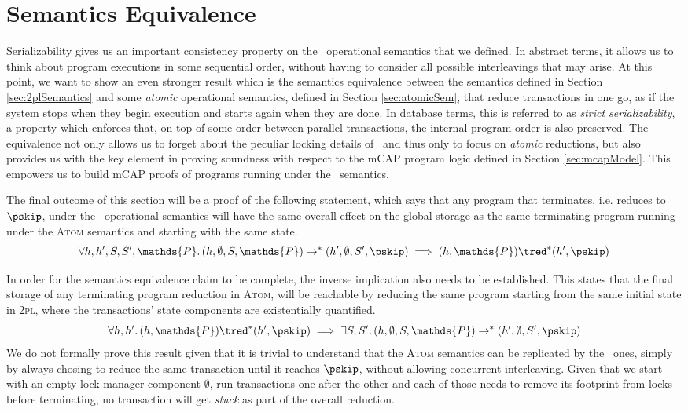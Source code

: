 \section{Semantics Equivalence}

\label{sec:semEquiv}

Serializability gives us an important consistency property on the \tpl\ operational semantics that we defined. In abstract terms, it allows us to think about program executions in some sequential order, without having to consider all possible interleavings that may arise. At this point, we want to show an even stronger result which is the semantics equivalence between the semantics defined in Section \ref{sec:2plSemantics} and some \textit{atomic} operational semantics, defined in Section \ref{sec:atomicSem}, that reduce transactions in one go, as if the system stops when they begin execution and starts again when they are done. In database terms, this is referred to as \textit{strict serializability}, a property which enforces that, on top of some order between parallel transactions, the internal program order is also preserved. The equivalence not only allows us to forget about the peculiar locking details of \tpl\ and thus only to focus on \textit{atomic} reductions, but also provides us with the key element in proving soundness with respect to the mCAP program logic defined in Section \ref{sec:mcapModel}. This empowers us to build mCAP proofs of programs running under the \tpl\ semantics.

The final outcome of this section will be a proof of the following statement, which says that any program that terminates, i.e. reduces to $\pskip$, under the \tpl\ operational semantics will have the same overall effect on the global storage as the same terminating program running under the \textsc{Atom} semantics and starting with the same state.
\[
	\forall h, h', S, S', \mathds{P} \ldotp
	(h, \emptyset, S, \mathds{P}) \rightarrow^* (h', \emptyset, S', \pskip) \implies 
	(h, \mathds{P}) \tred^* (h', \pskip)
\]

In order for the semantics equivalence claim to be complete, the inverse implication also needs to be established. This states that the final storage of any terminating program reduction in \textsc{Atom}, will be reachable by reducing the same program starting from the same initial state in \textsc{2pl}, where the transactions' state components are existentially quantified.
\[
	\forall h, h' \ldotp
	(h, \mathds{P}) \tred^* (h', \pskip)
	\implies
	\exists S, S' \ldotp
	(h, \emptyset, S, \mathds{P}) \rightarrow^* (h', \emptyset, S', \pskip)
\]
We do not formally prove this result given that it is trivial to understand that the \textsc{Atom} semantics can be replicated by the \tpl\ ones, simply by always chosing to reduce the same transaction until it reaches $\pskip$, without allowing concurrent interleaving. Given that we start with an empty lock manager component $\emptyset$, run transactions one after the other and each of those needs to remove its footprint from locks before terminating, no transaction will get \textit{stuck} as part of the overall reduction.

